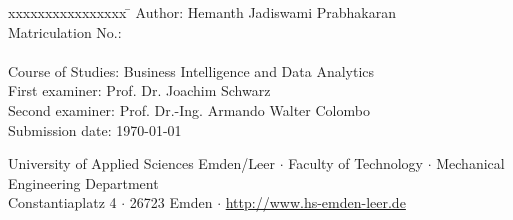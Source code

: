 \begin{titlepage}
    \vspace{0.3cm}
    \small
    \begin{tabbing}
        xxxxxxxxxxxxxxxx \= \kill
        Author: \> Hemanth Jadiswami Prabhakaran \\
        Matriculation No.:  \\
        \\
        Course of Studies: \> Business Intelligence and Data Analytics \\ [0.3cm]
        First examiner: \> Prof. Dr. Joachim Schwarz \\
        Second examiner: \> Prof. Dr.-Ing. Armando Walter Colombo \\ [0.3cm]
        Submission date: \> \today \\
    \end{tabbing}

    \vfill
    \small
    \begin{center}
        University of Applied Sciences Emden/Leer $\cdot$
        Faculty of Technology $\cdot$
        Mechanical Engineering Department \\
        Constantiaplatz 4 $\cdot$
        26723 Emden $\cdot$
        \url{http://www.hs-emden-leer.de}
    \end{center}

\end{titlepage}
